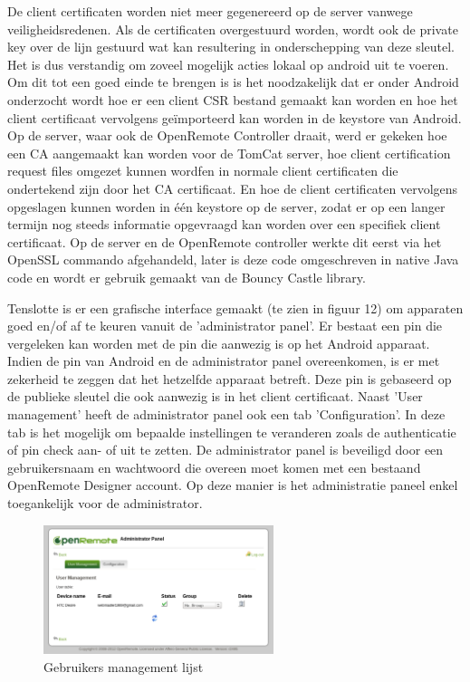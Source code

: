 \documentclass[]{article}
\begin{document}
De client certificaten worden niet meer gegenereerd op de server vanwege
veiligheidsredenen. Als de certificaten overgestuurd worden, wordt ook
de private key over de lijn gestuurd wat kan resultering in onderschepping van
deze sleutel. Het is dus verstandig om zoveel mogelijk acties lokaal op android uit te
voeren. Om dit tot een goed einde te brengen is is het noodzakelijk
dat er onder Android onderzocht wordt hoe er een client CSR bestand gemaakt kan
worden en hoe het client certificaat vervolgens ge\"importeerd kan worden in de
keystore van Android. Op de server, waar ook de OpenRemote Controller draait, werd
er gekeken hoe een CA aangemaakt kan worden voor de TomCat server, hoe client
certification request files omgezet kunnen wordfen in normale client certificaten die
ondertekend zijn door het CA certificaat. En hoe de client certificaten
vervolgens opgeslagen kunnen worden in \'e\'en keystore op de server, zodat er op een langer
termijn nog steeds informatie opgevraagd kan worden over een specifiek client certificaat.
Op de server en de OpenRemote controller werkte dit eerst via het OpenSSL
commando afgehandeld, later is deze code omgeschreven in native Java code en
wordt er gebruik gemaakt van de Bouncy Castle library.

Tenslotte is er een grafische interface gemaakt (te zien in figuur 12) om
apparaten goed en/of af te keuren vanuit de 'administrator panel'. Er bestaat
een pin die vergeleken kan worden met de pin die aanwezig is op het Android
apparaat. Indien de pin van Android en de administrator panel overeenkomen, is
er met zekerheid te zeggen dat het hetzelfde apparaat betreft. Deze pin is
gebaseerd op de publieke sleutel die ook aanwezig is in het client certificaat.
Naast 'User management' heeft de administrator panel ook een tab
'Configuration'. In deze tab is het mogelijk om bepaalde instellingen te
veranderen zoals de authenticatie of pin check aan- of uit te zetten.  De
administrator panel is beveiligd door een gebruikersnaam en wachtwoord die
overeen moet komen met een bestaand OpenRemote Designer account. Op deze manier
is het administratie paneel enkel toegankelijk voor de administrator.

\begin{figure}[htpb]
   \begin{center}
     \includegraphics[width=0.6\textwidth]{userlist.pdf}
   \end{center}
   \label{userlist}
   \caption{Gebruikers management lijst}
\end{figure}
\end{document}
